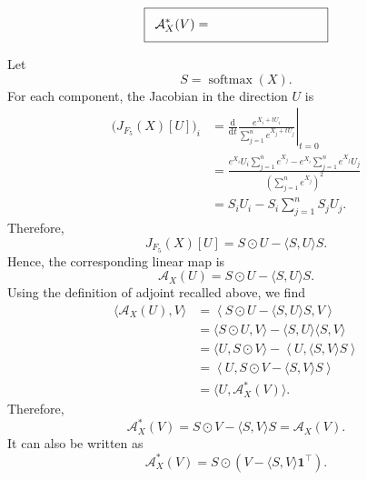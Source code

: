 \documentclass{article}
\theoremstyle{definition}
\theoremstyle{remark}
\begin{document}
    \[
    \setlength{\fboxsep}{8pt}
    \fbox{$\displaystyle \mathcal{A}_X^*(V) = \hspace{3cm}$}
    \]
    
    \begin{solution}
        Let
        \[
            S=\operatorname{softmax}(X).
        \]
        For each component, the Jacobian in the direction $U$ is
        \[
        \begin{aligned}
            \bigl(J_{F_5}(X)[U]\bigr)_i
            &=
            \left.
            \frac{\mathrm{d}}{\mathrm{d}t}
            \frac{e^{X_i+tU_i}}
            {\sum_{j=1}^n e^{X_j+tU_j}}
            \right|_{t=0} \\
            &= \frac{
            e^{X_i}U_i\sum_{j=1}^n e^{X_j}
            -
            e^{X_i}\sum_{j=1}^n e^{X_j}U_j
            }{
            \left(\sum_{j=1}^n e^{X_j}\right)^2
            } \\[1mm]
            &=
            S_i U_i
            -
            S_i\sum_{j=1}^n S_jU_j.
        \end{aligned}
        \]
        Therefore,
        \[
            J_{F_5}(X)[U]
            =
            S\odot U-\langle S,U\rangle S.
        \]
        Hence, the corresponding linear map is
        \[
            \mathcal{A}_X(U)
            =
            S\odot U-\langle S,U\rangle S.
        \]
        Using the definition of adjoint recalled above, we find
        \[
        \begin{aligned}
            \langle \mathcal{A}_X(U),V\rangle
            &=
            \left\langle
            S\odot U-\langle S,U\rangle S,V
            \right\rangle \\
            &=
            \langle S\odot U,V\rangle
            -
            \langle S,U\rangle\langle S,V\rangle \\
            &=
            \langle U,S\odot V\rangle
            -
            \left\langle
            U,\langle S,V\rangle S
            \right\rangle \\
            &=
            \left\langle
            U,
            S\odot V-\langle S,V\rangle S
            \right\rangle \\
            &=
            \langle U,\mathcal{A}_X^*(V)\rangle.
        \end{aligned}
        \]
        Therefore,
        \[
            \mathcal{A}_X^*(V)
            =
            S\odot V-\langle S,V\rangle S
            =
            \mathcal{A}_X(V).
        \]
        It can also be written as 
        \[
            \mathcal{A}_X^*(V)
            =
            S\odot (V-\langle S,V\rangle \mathbf{1}^\top).
        \]
    \end{solution}
    \vspace{0.3cm}
\end{document}
